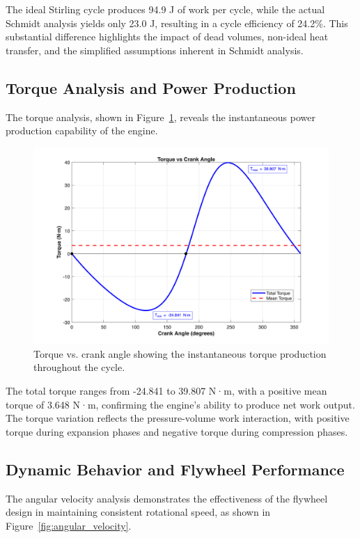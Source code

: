 \documentclass[12pt]{article}
\begin{document}
The ideal Stirling cycle produces 94.9 J of work per cycle, while the actual Schmidt analysis yields only 23.0 J, resulting in a cycle efficiency of 24.2\%. This substantial difference highlights the impact of dead volumes, non-ideal heat transfer, and the simplified assumptions inherent in Schmidt analysis.

\subsection{Torque Analysis and Power Production}
The torque analysis, shown in Figure~\ref{fig:torque_angle}, reveals the instantaneous power production capability of the engine.

\begin{figure}[htbp]
  \centering
  \includegraphics[width=0.8\linewidth]{../torque_vs_angle.png}
  \caption{Torque vs. crank angle showing the instantaneous torque production throughout the cycle.}
  \label{fig:torque_angle}
\vspace{-6pt}\end{figure}

The total torque ranges from -24.841 to 39.807 N·m, with a positive mean torque of 3.648 N·m, confirming the engine's ability to produce net work output. The torque variation reflects the pressure-volume work interaction, with positive torque during expansion phases and negative torque during compression phases.

\subsection{Dynamic Behavior and Flywheel Performance}
The angular velocity analysis demonstrates the effectiveness of the flywheel design in maintaining consistent rotational speed, as shown in Figure~\ref{fig:angular_velocity}.
\end{document}
